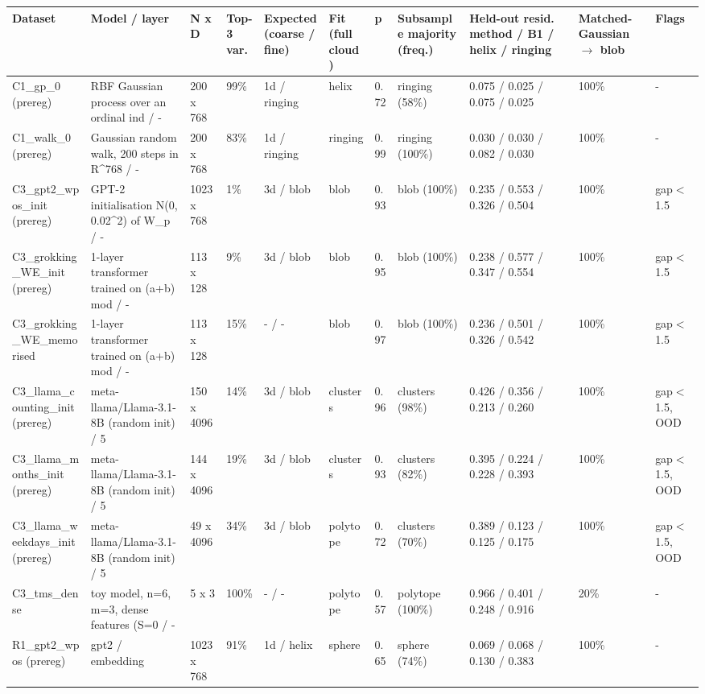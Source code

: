 \scriptsize
\begin{tabular}{lllllllllll}
\toprule
\textbf{Dataset} & \textbf{Model / layer} & \textbf{N x D} & \textbf{Top-3 var.} & \textbf{Expected (coarse / fine)} & \textbf{Fit (full cloud)} & \textbf{p} & \textbf{Subsample majority (freq.)} & \textbf{Held-out resid. method / B1 / helix / ringing} & \textbf{Matched-Gaussian $\to$ blob} & \textbf{Flags} \\
\midrule
C1\_gp\_0 (prereg) & RBF Gaussian process over an ordinal ind / - & 200 x 768 & 99\% & 1d / ringing & helix & 0.72 & ringing (58\%) & 0.075 / 0.025 / 0.075 / 0.025 & 100\% & - \\
C1\_walk\_0 (prereg) & Gaussian random walk, 200 steps in R\textasciicircum{}768 / - & 200 x 768 & 83\% & 1d / ringing & ringing & 0.99 & ringing (100\%) & 0.030 / 0.030 / 0.082 / 0.030 & 100\% & - \\
C3\_gpt2\_wpos\_init (prereg) & GPT-2 initialisation N(0, 0.02\textasciicircum{}2) of W\_p / - & 1023 x 768 & 1\% & 3d / blob & blob & 0.93 & blob (100\%) & 0.235 / 0.553 / 0.326 / 0.504 & 100\% & gap$<$1.5 \\
C3\_grokking\_WE\_init (prereg) & 1-layer transformer trained on (a+b) mod / - & 113 x 128 & 9\% & 3d / blob & blob & 0.95 & blob (100\%) & 0.238 / 0.577 / 0.347 / 0.554 & 100\% & gap$<$1.5 \\
C3\_grokking\_WE\_memorised & 1-layer transformer trained on (a+b) mod / - & 113 x 128 & 15\% & - / - & blob & 0.97 & blob (100\%) & 0.236 / 0.501 / 0.326 / 0.542 & 100\% & gap$<$1.5 \\
C3\_llama\_counting\_init (prereg) & meta-llama/Llama-3.1-8B (random init) / 5 & 150 x 4096 & 14\% & 3d / blob & clusters & 0.96 & clusters (98\%) & 0.426 / 0.356 / 0.213 / 0.260 & 100\% & gap$<$1.5, OOD \\
C3\_llama\_months\_init (prereg) & meta-llama/Llama-3.1-8B (random init) / 5 & 144 x 4096 & 19\% & 3d / blob & clusters & 0.93 & clusters (82\%) & 0.395 / 0.224 / 0.228 / 0.393 & 100\% & gap$<$1.5, OOD \\
C3\_llama\_weekdays\_init (prereg) & meta-llama/Llama-3.1-8B (random init) / 5 & 49 x 4096 & 34\% & 3d / blob & polytope & 0.72 & clusters (70\%) & 0.389 / 0.123 / 0.125 / 0.175 & 100\% & gap$<$1.5, OOD \\
C3\_tms\_dense & toy model, n=6, m=3, dense features (S=0 / - & 5 x 3 & 100\% & - / - & polytope & 0.57 & polytope (100\%) & 0.966 / 0.401 / 0.248 / 0.916 & 20\% & - \\
R1\_gpt2\_wpos (prereg) & gpt2 / embedding & 1023 x 768 & 91\% & 1d / helix & sphere & 0.65 & sphere (74\%) & 0.069 / 0.068 / 0.130 / 0.383 & 100\% & - \\

\end{tabular}
